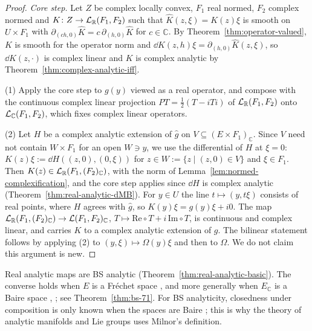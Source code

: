 \begin{proof}
  \leanok
  \emph{Core step.} Let $Z$ be complex locally convex, $F_1$ real normed, $F_2$ complex normed
  and $K \colon Z \to \mathcal{L}_{\mathbb{R}}(F_1, F_2)$ such that $\hat K(z, \xi) = K(z)\xi$ is smooth
  on $U \times F_1$ with $\partial_{(ch, 0)}\hat K = c\, \partial_{(h, 0)}\hat K$ for
  $c \in \mathbb{C}$. By Theorem~\ref{thm:operator-valued}, $K$ is smooth for the operator norm and
  $\dd K(z, h)\xi = \partial_{(h, 0)} \hat K(z, \xi)$, so $\dd K(z, \cdot)$ is complex linear and
  $K$ is complex analytic by Theorem~\ref{thm:complex-analytic-iff}.

  (1) Apply the core step to $g(y)$ viewed as a real operator, and compose with the continuous
  complex linear projection $P T = \frac12(T - iTi)$ of $\mathcal{L}_{\mathbb{R}}(F_1, F_2)$ onto
  $\mathcal{L}_{\mathbb{C}}(F_1, F_2)$, which fixes complex linear operators.

  (2) Let $H$ be a complex analytic extension of $\hat g$ on $V \subseteq (E \times F_1)_{\mathbb{C}}$.
  Since $V$ need not contain $W \times F_1$ for an open $W \ni y$, we use the differential of $H$
  at $\xi = 0$: $K(z)\xi := \dd H((z, 0), (0, \xi))$ for $z \in W := \{z \mid (z, 0) \in V\}$ and
  $\xi \in F_1$. Then $K(z) \in \mathcal{L}_{\mathbb{R}}(F_1, (F_2)_{\mathbb{C}})$, with the norm of
  Lemma~\ref{lem:normed-complexification}, and the core step applies since $\dd H$ is complex
  analytic (Theorem~\ref{thm:real-analytic-dMB}). For $y \in U$ the line $t \mapsto (y, t\xi)$
  consists of real points, where $H$ agrees with $\hat g$, so $K(y)\xi = g(y)\xi + i0$. The map
  $\mathcal{L}_{\mathbb{R}}(F_1, (F_2)_{\mathbb{C}}) \to \mathcal{L}(F_1, F_2)_{\mathbb{C}}$,
  $T \mapsto \mathrm{Re} \circ T + i\, \mathrm{Im} \circ T$, is continuous and complex linear, and
  carries $K$ to a complex analytic extension of $g$. The bilinear statement follows by applying
  (2) to $(y, \xi) \mapsto \Omega(y)\xi$ and then to $\Omega$. We do not claim this argument is
  new.
\end{proof}

\begin{remark}
  Real analytic maps are BS analytic (Theorem~\ref{thm:real-analytic-basic}). The converse holds
  when $E$ is a Fréchet space \cite[Rem.~2.2.7]{GN26}, and more generally when $E_{\mathbb{C}}$ is
  a Baire space \cite[Thm.~7.1]{BS71b}, \cite[2.9]{Glo02}; see Theorem~\ref{thm:bs-71}. For BS analyticity, closedness under
  composition is only known when the spaces are Baire \cite[Thm.~7.3]{BS71b}; this is why the
  theory of analytic manifolds and Lie groups uses Milnor's definition.
\end{remark}

